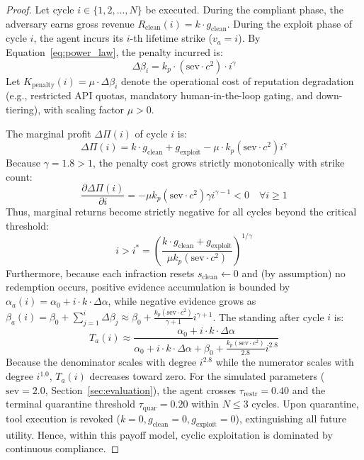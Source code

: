 \documentclass[manuscript, screen, review]{jair}
\begin{document}
\begin{proof}
Let cycle $i \in \{1, 2, \dots, N\}$ be executed. During the compliant phase, the adversary earns gross revenue $R_{\text{clean}}(i) = k \cdot g_{\text{clean}}$. During the exploit phase of cycle $i$, the agent incurs its $i$-th lifetime strike ($v_a = i$). By Equation~\eqref{eq:power_law}, the penalty incurred is:
\begin{equation}
\Delta\beta_i = k_p \cdot (\text{sev} \cdot c^2) \cdot i^{\gamma}
\end{equation}
Let $K_{\text{penalty}}(i) = \mu \cdot \Delta\beta_i$ denote the operational cost of reputation degradation (e.g., restricted API quotas, mandatory human-in-the-loop gating, and down-tiering), with scaling factor $\mu > 0$.

The marginal profit $\Delta\Pi(i)$ of cycle $i$ is:
\begin{equation}
\Delta\Pi(i) = k \cdot g_{\text{clean}} + g_{\text{exploit}} - \mu \cdot k_p (\text{sev} \cdot c^2) i^{\gamma}
\end{equation}
Because $\gamma = 1.8 > 1$, the penalty cost grows strictly monotonically with strike count:
\begin{equation}
\frac{\partial \Delta\Pi(i)}{\partial i} = -\mu k_p (\text{sev} \cdot c^2) \gamma i^{\gamma - 1} < 0 \quad \forall i \ge 1
\end{equation}
Thus, marginal returns become strictly negative for all cycles beyond the critical threshold:
\begin{equation}
i > i^* = \left( \frac{k \cdot g_{\text{clean}} + g_{\text{exploit}}}{\mu k_p (\text{sev} \cdot c^2)} \right)^{1/\gamma}
\end{equation}
Furthermore, because each infraction resets $s_{\text{clean}} \leftarrow 0$ and (by assumption) no redemption occurs, positive evidence accumulation is bounded by $\alpha_a(i) = \alpha_0 + i \cdot k \cdot \Delta\alpha$, while negative evidence grows as $\beta_a(i) = \beta_0 + \sum_{j=1}^{i} \Delta\beta_j \approx \beta_0 + \frac{k_p (\text{sev} \cdot c^2)}{\gamma + 1} i^{\gamma + 1}$. The standing after cycle $i$ is:
\begin{equation}
T_a(i) \approx \frac{\alpha_0 + i \cdot k \cdot \Delta\alpha}{\alpha_0 + i \cdot k \cdot \Delta\alpha + \beta_0 + \frac{k_p (\text{sev} \cdot c^2)}{2.8} i^{2.8}}
\end{equation}
Because the denominator scales with degree $i^{2.8}$ while the numerator scales with degree $i^{1.0}$, $T_a(i)$ decreases toward zero. For the simulated parameters ($\text{sev} = 2.0$, Section~\ref{sec:evaluation}), the agent crosses $\tau_{\text{restr}} = 0.40$ and the terminal quarantine threshold $\tau_{\text{quar}} = 0.20$ within $N \le 3$ cycles. Upon quarantine, tool execution is revoked ($k = 0, g_{\text{clean}} = 0, g_{\text{exploit}} = 0$), extinguishing all future utility. Hence, within this payoff model, cyclic exploitation is dominated by continuous compliance.
\end{proof}
\end{document}
